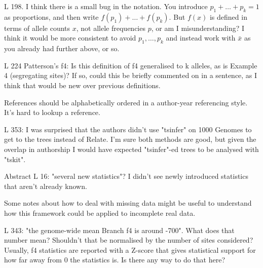 \reply{
}

\begin{point}{L 198.}
    I think there is a small bug in the notation. You introduce $p_1+\ldots+p_k=1$ as proportions, and then write $f(p_1)+\ldots+f(p_k)$. But $f(x)$ is defined in terms of allele counts $x$, not allele frequencies $p$, or am I misunderstanding? I think it would be more consistent to avoid $p_1,\ldots,p_k$ and instead work with $\bar{x}$ as you already had further above, or so.
\end{point}

\reply{
}

\begin{point}{L 224}
    Patterson's f4: Is this definition of f4 generalised to k alleles, as is Example 4 (segregating sites)? If so, could this be briefly commented on in a sentence, as I think that would be new over previous definitions.
\end{point}

\reply{
}

\begin{point}{References}
    should be alphabetically ordered in a author-year referencing style. It's hard to lookup a reference.
\end{point}

\reply{
}

\begin{point}{L 353:}
I was surprised that the authors didn't use "tsinfer" on 1000 Genomes to get to the trees instead of Relate. I'm sure both methods are good, but given the overlap in authorship I would have expected "tsinfer"-ed trees to be analysed with "tskit".
\end{point}

\reply{
}

\begin{point}{Abstract L 16:}
    "several new statistics"? I didn't see newly introduced statistics that aren't already known.
\end{point}

\reply{
}

\begin{point}{}
    Some notes about how to deal with missing data might be useful to understand how this framework could be applied to incomplete real data.
\end{point}

\reply{
}

\begin{point}{L 343:}
    "the genome-wide mean Branch f4 is around -700". What does that number mean? Shouldn't that be normalised by the number of sites considered? Usually, f4 statistics are reported with a Z-score that gives statistical support for how far away from 0 the statistics is. Is there any way to do that here?
\end{point}

\reply{
}


